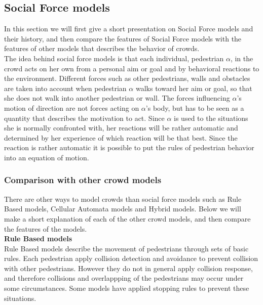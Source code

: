 \subsection{Social Force models}

In this section we will first give a short presentation on Social Force models and their history,
and then compare the features of Social Force models with the features of other models that describes
the behavior of crowds.
\\

The idea behind social force models is that each individual, pedestrian $\alpha$, in the crowd acts 
on her own from a personal aim or goal and by behavioral reactions to the environment. 
Different forces such as other pedestrians, walls and obstacles are taken into account 
when pedestrian $\alpha$ walks toward her aim or goal, so that she does not walk 
into another pedestrian or wall. The forces influencing $\alpha$'s motion 
of direction are not forces acting on $\alpha$'s body, but has to be seen as a quantity 
that describes the motivation to act. Since $\alpha$ is used to the situations 
she is normally confronted with, her reactions will be rather automatic and 
determined by her experience of which reaction will be that best. Since the reaction 
is rather automatic it is possible to put the rules of pedestrian behavior into an equation 
of motion.\cite{social-force}

\subsubsection{Comparison with other crowd models}
There are other ways to model crowds than social force models such as Rule Based models, 
Cellular Automata models and Hybrid models. Below we will make a short explanation of each of the 
other crowd models, and then compare the features of the models.\\												%

\textbf{Rule Based models}\\
Rule Based models describe the movement of pedestrians through sets of basic rules. Each 
pedestrian apply collision detection and avoidance to prevent collision with other pedestrians. 
However they do not in general apply collision response, and therefore collisions and overlappping 
of the pedestrians may occur under some circumstances. Some models have applied stopping 
rules to prevent these situations.\cite{Comparison}

